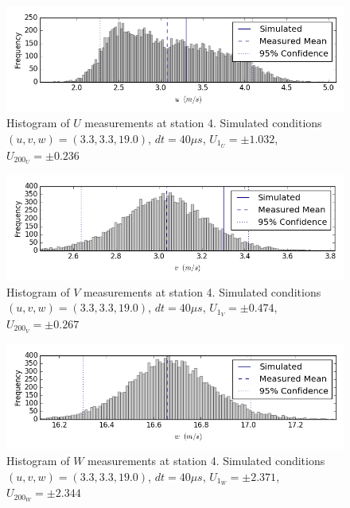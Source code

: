 \begin{figure}[H]
\centering
\includegraphics[width=6in]{figs/Ely_May28th04002/uncertainty_Ely_May28th04002_U}
\caption{Histogram of $U$ measurements at station 4. Simulated conditions $(u,v,w)=(3.3, 3.3, 19.0)$, $dt=40 \mu s$, $U_1_U=\pm 1.032$, $U_200_U=\pm 0.236$}
\label{fig:uncertainty_Ely_May28th04002_U}
\end{figure}


\begin{figure}[H]
\centering
\includegraphics[width=6in]{figs/Ely_May28th04002/uncertainty_Ely_May28th04002_V}
\caption{Histogram of $V$ measurements at station 4. Simulated conditions $(u,v,w)=(3.3, 3.3, 19.0)$, $dt=40 \mu s$, $U_1_V=\pm 0.474$, $U_200_V=\pm 0.267$}
\label{fig:uncertainty_Ely_May28th04002_V}
\end{figure}


\begin{figure}[H]
\centering
\includegraphics[width=6in]{figs/Ely_May28th04002/uncertainty_Ely_May28th04002_W}
\caption{Histogram of $W$ measurements at station 4. Simulated conditions $(u,v,w)=(3.3, 3.3, 19.0)$, $dt=40 \mu s$, $U_1_W=\pm 2.371$, $U_200_W=\pm 2.344$}
\label{fig:uncertainty_Ely_May28th04002_W}
\end{figure}


